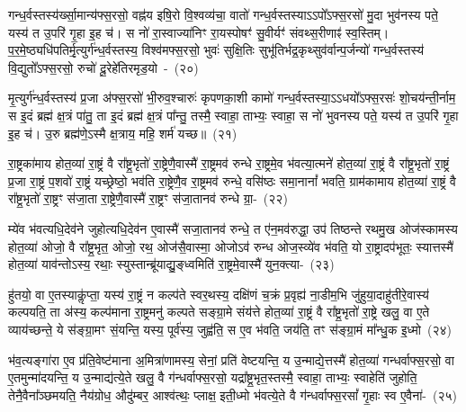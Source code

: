 गन्ध॒र्वस्तस्य॑र्ख्सा॒मान्य॑फ्स॒रसो॒ वह्न॑य इषि॒रो वि॒श्वव्य॑चा॒ वातो॑ गन्ध॒र्वस्तस्या\-ऽऽ\-पो᳚\-ऽफ्स॒रसो॑ मु॒दा भुव॑नस्य पते॒ यस्य॑ त उ॒परि॑ गृ॒हा इ॒ह च॑। स नो॑ रा॒स्वाज्या॑निꣳ रा॒यस्पोषꣳ॑ सु॒वीर्यꣳ॑ संवथ्स॒रीणाꣴ॑ स्व॒स्तिम्। प॒र॒मे॒ष्ठ्यधि॑\-पति\-र्मृ॒त्युर्ग॑न्ध॒र्वस्तस्य॒ विश्व॑मफ्स॒रसो॒ भुवः॑ सुक्षि॒तिः सुभू॑तिर्भद्र॒कृथ्सुव॑र्वान्प॒र्जन्यो॑ गन्ध॒र्वस्तस्य॑ वि॒द्युतो᳚\-ऽफ्स॒रसो॒ रुचो॑ दू॒रेहे॑तिरमृड॒यो~-~(२०)\ip

मृ॒त्युर्ग॑न्ध॒र्वस्तस्य॑ प्र॒जा अ॑फ्स॒रसो॑ भी॒रुव॒श्चारुः॑ कृपणका॒शी कामो॑ गन्ध॒र्वस्तस्या॒\-ऽऽ\-\-धयो᳚\-ऽफ्स॒रसः॑ शो॒चय॑न्ती॒र्नाम॒ स इ॒दं ब्रह्म॑ क्ष॒त्रं पा॑तु॒ ता इ॒दं ब्रह्म॑ क्ष॒त्रं पा᳚न्तु॒ तस्मै॒ स्वाहा॒ ताभ्यः॒ स्वाहा॒ स नो॑ भुवनस्य पते॒ यस्य॑ त उ॒परि॑ गृ॒हा इ॒ह च॑। उ॒रु ब्रह्म॑णे॒\-ऽस्मै क्ष॒त्राय॒ महि॒ शर्म॑ यच्छ॥~(२१)\ip

{\anuvakamend[{मनो॑\-ऽमृड॒यः षट्च॑त्वारिꣳशच्च}]}

रा॒ष्ट्रका॑माय होत॒व्या॑ रा॒ष्ट्रं वै रा᳚ष्ट्र॒भृतो॑ रा॒ष्ट्रेणै॒वास्मै॑ रा॒ष्ट्रमव॑ रुन्धे रा॒ष्ट्रमे॒व भ॑वत्या॒त्मने॑ होत॒व्या॑ रा॒ष्ट्रं वै रा᳚ष्ट्र॒भृतो॑ रा॒ष्ट्रं प्र॒जा रा॒ष्ट्रं प॒शवो॑ रा॒ष्ट्रं यच्छ्रेष्ठो॒ भव॑ति रा॒ष्ट्रेणै॒व रा॒ष्ट्रमव॑ रुन्धे॒ वसि॑ष्ठः समा॒नानां᳚ भवति॒ ग्राम॑कामाय होत॒व्या॑ रा॒ष्ट्रं वै रा᳚ष्ट्र॒भृतो॑ रा॒ष्ट्रꣳ स॑जा॒ता रा॒ष्ट्रेणै॒वास्मै॑ रा॒ष्ट्रꣳ स॑जा॒तानव॑ रुन्धे ग्रा॒-~(२२)\ip

म्ये॑व भ॑वत्यधि॒देव॑ने जुहोत्यधि॒देव॑न ए॒वास्मै॑ सजा॒तानव॑ रुन्धे॒ त ए॑न॒मव॑रुद्धा॒ उप॑ तिष्ठन्ते रथमु॒ख ओज॑स्कामस्य होत॒व्या॑ ओजो॒ वै रा᳚ष्ट्र॒भृत॒ ओजो॒ रथ॒ ओज॑सै॒वास्मा॒ ओजो\-ऽव॑ रुन्ध ओज॒स्व्ये॑व भ॑वति॒ यो रा॒ष्ट्रादप॑भूतः॒ स्यात्तस्मै॑ होत॒व्या॑ याव॑न्तो\-ऽस्य॒ रथाः॒ स्युस्तान्ब्रू॑याद्यु॒ङ्‌ध्वमिति॑ रा॒ष्ट्रमे॒वास्मै॑ युन॒क्त्या-~(२३)\ip

हु॑तयो॒ वा ए॒तस्याकॢ॑प्ता॒ यस्य॑ रा॒ष्ट्रं न कल्प॑ते स्वर॒थस्य॒ दक्षि॑णं च॒क्रं प्र॒वृह्य॑ ना॒डीम॒भि जु॑हुया॒दाहु॑तीरे॒वास्य॑ कल्पयति॒ ता अ॑स्य॒ कल्प॑माना रा॒ष्ट्रमनु॑ कल्पते सङ्ग्रा॒मे संय॑त्ते होत॒व्या॑ रा॒ष्ट्रं वै रा᳚ष्ट्र॒भृतो॑ रा॒ष्ट्रे खलु॒ वा ए॒ते व्याय॑च्छन्ते॒ ये स॑ङ्ग्रा॒मꣳ सं॒यन्ति॒ यस्य॒ पूर्व॑स्य॒ जुह्व॑ति॒ स ए॒व भ॑वति॒ जय॑ति॒ तꣳ स॑ङ्ग्रा॒मं मा᳚न्धु॒क इ॒ध्मो~(२४)\ip

भ॑व॒त्यङ्गा॑रा ए॒व प्र॑ति॒वेष्ट॑माना अ॒मित्रा॑णामस्य॒ सेनां॒ प्रति॑ वेष्टयन्ति॒ य उ॒न्माद्ये॒त्तस्मै॑ होत॒व्या॑ गन्धर्वाफ्स॒रसो॒ वा ए॒तमुन्मा॑दयन्ति॒ य उ॒न्माद्य॑त्ये॒ते खलु॒ वै ग॑न्धर्वाफ्स॒रसो॒ यद्रा᳚ष्ट्र॒भृत॒स्तस्मै॒ स्वाहा॒ ताभ्यः॒ स्वाहेति॑ जुहोति॒ तेनै॒वैना᳚ञ्छमयति॒ नैय॑ग्रोध॒ औदु॑म्बर॒ आश्व॑त्थः॒ प्लाक्ष॒ इती॒ध्मो भ॑वत्ये॒ते वै ग॑न्धर्वाफ्स॒रसां᳚ गृ॒हाः स्व ए॒वैना॑-~(२५)\ip


